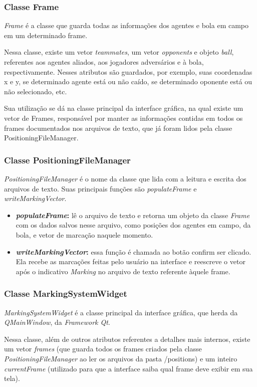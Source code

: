 \documentclass[a4paper,12pt]{article}
\begin{document}
\subsubsection{Classe Frame}
\textit{Frame} é a classe que guarda todas as informações dos agentes e bola em campo em um determinado frame.

Nessa classe, existe um vetor \textit{teammates}, um vetor \textit{opponents} e objeto \textit{ball}, referentes aos agentes aliados, aos jogadores adversários e à bola, respectivamente. Nesses atributos são guardados, por exemplo, suas coordenadas x e y, se determinado agente está ou não caído, se determinado oponente está ou não selecionado, etc.

Sua utilização se dá na classe principal da interface gráfica, na qual existe um vetor de Frames, responsável por manter as informações contidas em todos os frames documentados nos arquivos de texto, que já foram lidos pela classe PositioningFileManager.

\subsubsection{Classe PositioningFileManager}
\textit{PositioningFileManager} é o nome da classe que lida com a leitura e escrita dos arquivos de texto. Suas principais funções são \textit{populateFrame} e \textit{writeMarkingVector}.

\begin{itemize}
\item \textbf{\textit{populateFrame}:} lê o arquivo de texto e retorna um objeto da classe \textit{Frame} com os dados salvos nesse arquivo, como posições dos agentes em campo, da bola, e vetor de marcação naquele momento.

\item \textbf{\textit{writeMarkingVector}:} essa função é chamada ao botão confirm ser clicado. Ela recebe as marcações feitas pelo usuário na interface e reescreve o vetor após o indicativo \textit{Marking} no arquivo de texto referente àquele frame.
\end{itemize}

\subsubsection{Classe MarkingSystemWidget}
\textit{MarkingSystemWidget} é a classe principal da interface gráfica, que herda da \textit{QMainWindow}, da \textit{Framework Qt}.

Nessa classe, além de outros atributos referentes a detalhes mais internos, existe um vetor \textit{frames} (que guarda todos os frames criados pela classe \textit{PositioningFileManager} ao ler os arquivos da pasta /positions) e um inteiro \textit{currentFrame} (utilizado para que a interface saiba qual frame deve exibir em sua tela).
\end{document}
